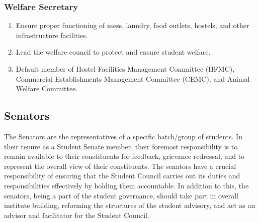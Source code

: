 \documentclass[12pt]{article}
\begin{document}
\subsubsection*{Welfare Secretary}
\begin{enumerate}
    \item Ensure proper functioning of mess, laundry, food outlets, hostels, and other infrastructure facilities.
    \item Lead the welfare council to protect and ensure student welfare.
    \item Default member of Hostel Facilities Management Committee (HFMC), Commercial Establishments Management Committee (CEMC), and Animal Welfare Committee.
\end{enumerate}

\subsection{Senators}
The Senators are the representatives of a specific batch/group of students. In their tenure as a Student Senate member, their foremost responsibility is to remain available to their constituents for feedback, grievance redressal, and to represent the overall view of their constituents. The senators have a crucial responsibility of ensuring that the Student Council carries out its duties and responsibilities effectively by holding them accountable. In addition to this, the senators, being a part of the student governance, should take part in overall institute building, reforming the structures of the student advisory, and act as an advisor and facilitator for the Student Council. \\
\end{document}
